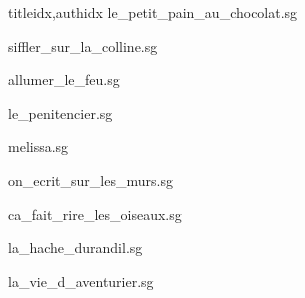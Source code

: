 \documentclass[12pt]{article}
\begin{document}
\begin{songs}{titleidx,authidx}
{le_petit_pain_au_chocolat.sg}


{siffler_sur_la_colline.sg}


{allumer_le_feu.sg}


{le_penitencier.sg}


{melissa.sg}


{on_ecrit_sur_les_murs.sg}


{ca_fait_rire_les_oiseaux.sg}


{la_hache_durandil.sg}


{la_vie_d_aventurier.sg}


\end{songs}
\end{document}
